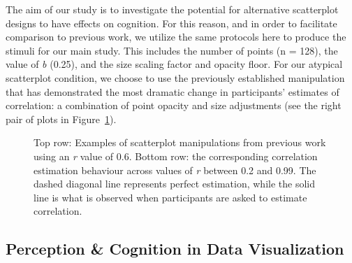 \documentclass[manuscript,screen,review,anonymous]{acmart}
\begin{document}
The aim of our study is to investigate the potential for alternative
scatterplot designs to have effects on cognition. For this reason, and
in order to facilitate comparison to previous work, we utilize the same
protocols here to produce the stimuli for our main study. This includes
the number of points (n = 128), the value of \emph{b} (0.25), and the
size scaling factor and opacity floor. For our atypical scatterplot
condition, we choose to use the previously established manipulation that
has demonstrated the most dramatic change in participants' estimates of
correlation: a combination of point opacity and size adjustments
\citep{strain_2024} (see the right pair of plots in
Figure~\ref{fig-previous-manipulations}).

\begin{figure}


\caption{\label{fig-previous-manipulations}Top row: Examples of
scatterplot manipulations from previous work using an \textit{r} value
of 0.6. Bottom row: the corresponding correlation estimation behaviour
across values of \textit{r} between 0.2 and 0.99. The dashed diagonal
line represents perfect estimation, while the solid line is what is
observed when participants are asked to estimate correlation.}

\end{figure}%

\subsection{Perception \& Cognition in Data
Visualization}\label{sec-perception-cognition}
\end{document}
